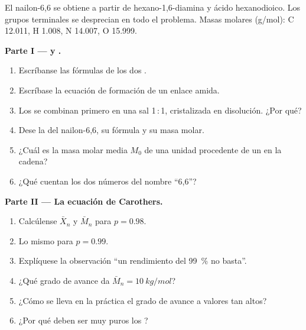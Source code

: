 \begin{problem}
\label{pb:b2:polymer-synthesis:1}
El nailon-6,6 se obtiene a partir de hexano-1,6-diamina y ácido hexanodioico. Los grupos terminales se desprecian en todo el problema.
Masas molares (\unit{g/mol}): C 12.011, H 1.008, N 14.007, O 15.999.

\medskip
\noindent\textbf{Parte I ---  y .}
\begin{enumerate}
  \item Escríbanse las fórmulas de los dos .
  \item Escríbase la ecuación de formación de un enlace amida.
  \item Los  se combinan primero en una sal 1\,:\,1, cristalizada en disolución. ¿Por qué?
  \item Dese la  del nailon-6,6, su fórmula y su masa molar.
  \item ¿Cuál es la masa molar media $M_0$ de una unidad procedente de un  en la cadena?
  \item ¿Qué cuentan los dos números del nombre ``6,6''?
\end{enumerate}

\medskip
\noindent\textbf{Parte II --- La ecuación de Carothers.}
\begin{enumerate}[resume]
  \item Calcúlense $\bar X_n$ y $\bar M_n$ para $p = 0.98$.
  \item Lo mismo para $p = 0.99$.
  \item Explíquese la observación ``un rendimiento del 99~\% no basta''.
  \item ¿Qué grado de avance da $\bar M_n = \qty{10}{kg/mol}$?
  \item ¿Cómo se lleva en la práctica el grado de avance a valores tan altos?
  \item ¿Por qué deben ser muy puros los ?
\end{enumerate}


\end{problem}
